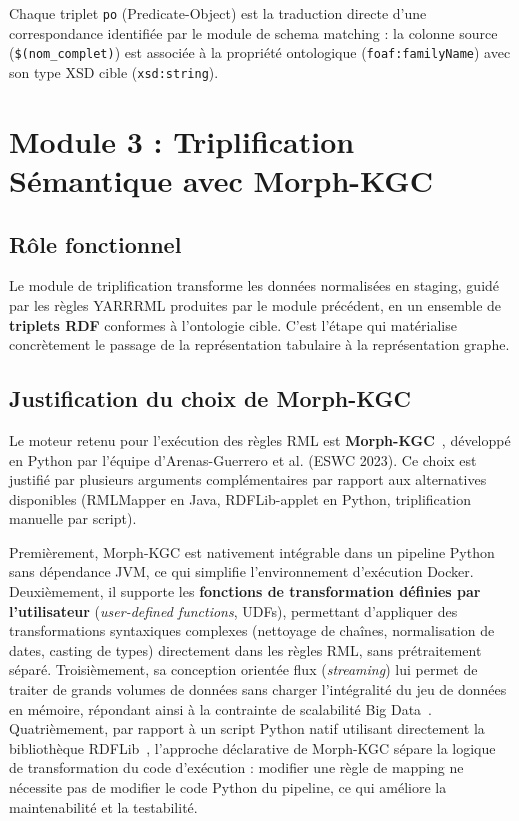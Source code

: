 Chaque triplet \texttt{po} (Predicate-Object) est la traduction directe d'une
correspondance identifiée par le module de schema matching : la colonne source
(\texttt{\$(nom\_complet)}) est associée à la propriété ontologique
(\texttt{foaf:familyName}) avec son type XSD cible (\texttt{xsd:string}).

\section{Module 3 : Triplification Sémantique avec Morph-KGC}
\label{sec:module_triplification}

\subsection{Rôle fonctionnel}

Le module de triplification transforme les données normalisées en
staging, guidé par les règles YARRRML produites par le module précédent,
en un ensemble de \textbf{triplets RDF} conformes à l'ontologie cible.
C'est l'étape qui matérialise concrètement le passage de la représentation
tabulaire à la représentation graphe.

\subsection{Justification du choix de Morph-KGC}

Le moteur retenu pour l'exécution des règles RML est
\textbf{Morph-KGC}~\cite{arenas2023morphkgc}, développé en Python par
l'équipe d'Arenas-Guerrero et al. (ESWC 2023).
Ce choix est justifié par plusieurs arguments complémentaires par rapport
aux alternatives disponibles (RMLMapper en Java, RDFLib-applet en Python,
triplification manuelle par script).

Premièrement, Morph-KGC est nativement intégrable dans un pipeline Python
sans dépendance JVM, ce qui simplifie l'environnement d'exécution Docker.
Deuxièmement, il supporte les \textbf{fonctions de transformation définies
par l'utilisateur} (\textit{user-defined functions}, UDFs), permettant
d'appliquer des transformations syntaxiques complexes (nettoyage de chaînes,
normalisation de dates, casting de types) directement dans les règles RML,
sans prétraitement séparé.
Troisièmement, sa conception orientée flux (\textit{streaming}) lui permet
de traiter de grands volumes de données sans charger l'intégralité du jeu
de données en mémoire, répondant ainsi à la contrainte de scalabilité
Big Data~\cite{arenas2023morphkgc}.
Quatrièmement, par rapport à un script Python natif utilisant directement
la bibliothèque RDFLib~\cite{rdflib2022}, l'approche déclarative de
Morph-KGC sépare la logique de transformation du code d'exécution :
modifier une règle de mapping ne nécessite pas de modifier le code Python
du pipeline, ce qui améliore la maintenabilité et la testabilité.


